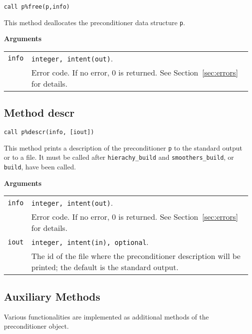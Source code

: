 \begin{center}
\verb|call p%free(p,info)|\\
\end{center}

\noindent
This method deallocates the preconditioner data structure \verb|p|.

{\baselineskip\noindent\large\bfseries Arguments} \smallskip

\begin{tabular}{p{1.2cm}p{10.5cm}}
\verb|info|   & \verb|integer, intent(out)|.\\
              & Error code. If no error, 0 is returned. See Section~\ref{sec:errors} for details.\\
\end{tabular}


\clearpage

\subsection{Method descr\label{sec:precdescr}}

\begin{center}
\verb|call p%descr(info, [iout])|\\
\end{center}

\noindent
This method prints a description of the preconditioner \verb|p| to the standard output or
to a file. It must be called after \verb|hierachy_build| and \verb|smoothers_build|,
or \verb|build|, have been called.

{\baselineskip\noindent\large\bfseries Arguments} \smallskip

\begin{tabular}{p{1.2cm}p{12cm}}
\verb|info|   & \verb|integer, intent(out)|.\\
              & Error code. If no error, 0 is returned. See Section~\ref{sec:errors} for details.\\
\verb|iout|   & \verb|integer, intent(in), optional|.\\
              & The id of the file where the preconditioner description
                will be printed; the default is the standard output.\\
\end{tabular}


\subsection{Auxiliary Methods\label{sec:auxil}}
Various functionalities are implemented as additional methods of the
preconditioner object.

